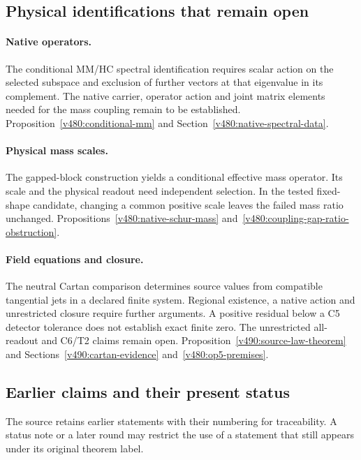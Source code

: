 \subsection*{Physical identifications that remain open}

\paragraph{Native operators.}
The conditional MM/HC spectral identification requires scalar action
on the selected subspace and exclusion of further vectors at that
eigenvalue in its complement. The native carrier, operator action and
joint matrix elements needed for the mass coupling remain to be
established.
Proposition~\ref{v480:conditional-mm} and
Section~\ref{v480:native-spectral-data}.

\paragraph{Physical mass scales.}
The gapped-block construction yields a conditional effective mass
operator. Its scale and the physical readout need independent
selection. In the tested fixed-shape candidate, changing a common
positive scale leaves the failed mass ratio unchanged.
Propositions~\ref{v480:native-schur-mass}
and~\ref{v480:coupling-gap-ratio-obstruction}.

\paragraph{Field equations and closure.}
The neutral Cartan comparison determines source values from compatible
tangential jets in a declared finite system. Regional existence,
a native action and unrestricted closure require further arguments.
A positive residual below a C5 detector tolerance does not establish
exact finite zero. The unrestricted all-readout and C6/T2 claims
remain open. Proposition~\ref{v490:source-law-theorem} and
Sections~\ref{v490:cartan-evidence} and~\ref{v480:op5-premises}.

\clearpage
\subsection*{Earlier claims and their present status}
\label{v5:earlier-claims}

The source retains earlier statements with their numbering for
traceability. A status note or a later round may restrict the use of a
statement that still appears under its original theorem label.

